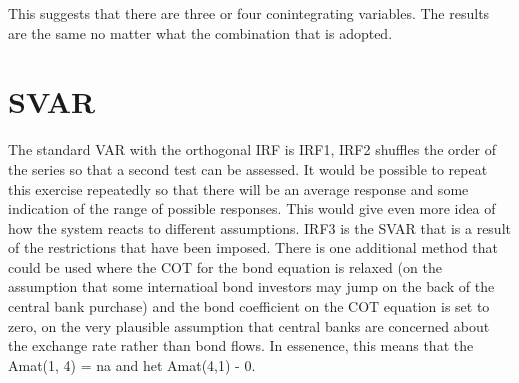 \documentclass{article}\usepackage{graphicx, color}
\begin{document}
This suggests that there are three or four conintegrating variables.  The results are the same no matter what the combination that is adopted.  

\section{SVAR}
The standard VAR with the orthogonal IRF is IRF1, IRF2 shuffles the order of the series so that a second test can be assessed.  It would be possible to repeat this exercise repeatedly so that there will be an average response and some indication of the range of possible responses. This would give even more idea of how the system reacts to different assumptions.  IRF3 is the SVAR that is a result of the restrictions that have been imposed.  There is one additional method that could be used where the COT for the bond equation is relaxed (on the assumption that some internatioal bond investors may jump on the back of the central bank purchase) and the bond coefficient on the COT equation is set to zero, on the very plausible assumption that central banks are concerned about the exchange rate rather than bond flows.  In essenence, this means that the Amat(1, 4) = na and het Amat(4,1) - 0.  
\end{document}
